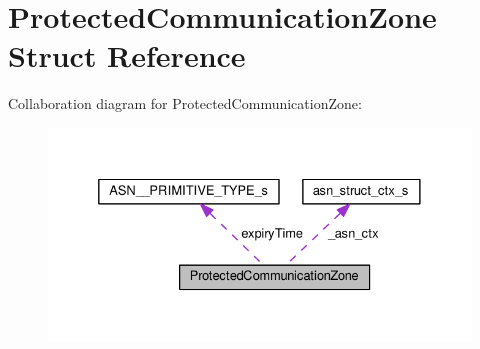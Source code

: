 \hypertarget{structProtectedCommunicationZone}{}\section{Protected\+Communication\+Zone Struct Reference}
\label{structProtectedCommunicationZone}


Collaboration diagram for Protected\+Communication\+Zone\+:\nopagebreak
\begin{figure}[H]
\begin{center}
\leavevmode
\includegraphics[width=332pt]{structProtectedCommunicationZone__coll__graph}
\end{center}
\end{figure}
